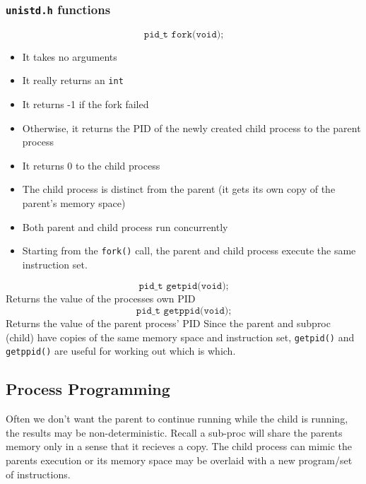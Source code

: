 \documentclass[a4paper, 10pt]{article}
\begin{document}
\subsubsection{\texttt{unistd.h} functions}
$$\boxed{\texttt{pid\_t fork(void);}}$$
\begin{itemize}
    \item It takes no arguments
    \item It really returns an \texttt{int}
    \item It returns -1 if the fork failed
    \item Otherwise, it returns the PID of the newly created child process to the parent process
    \item It returns 0 to the child process
    \item The child process is distinct from the parent (it gets its own copy of the parent's memory space)
    \item Both parent and child process run concurrently
    \item Starting from the \texttt{fork()} call, the parent and child process execute the same instruction set.
\end{itemize}
$$\boxed{\texttt{pid\_t getpid(void);}}$$
Returns the value of the processes own PID
$$\boxed{\texttt{pid\_t getppid(void);}}$$
Returns the value of the parent process' PID
Since the parent and subproc (child) have copies of the same memory space and instruction set, \texttt{getpid()}  and \texttt{getppid()} are useful for working out which is which.
\pagebreak
\subsection{Process Programming}
Often we don't want the parent to continue running while the child is running, the results may be non-deterministic. Recall a sub-proc will share the parents memory only in a sense that it recieves a copy. The  child process can mimic the parents execution  or its memory space may be overlaid with a new program/set of instructions. \\[2ex]
\end{document}
